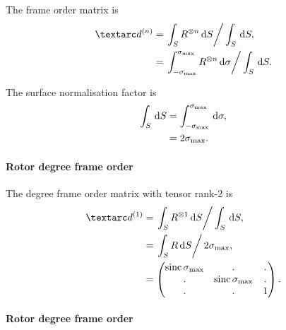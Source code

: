 The frame order matrix is
\begin{subequations}
\begin{align}
    \FOn &= \left. \int_S R^{\otimes n} \diff S \right / \int_S \diff S, \\
         &= \left. \int_{-\conesmax}^{\conesmax} R^{\otimes n} \diff \sigma  \right / \int_S \diff S.
\end{align}
\end{subequations}

The surface normalisation factor is
\begin{subequations}
\begin{align}
    \int_S \,\mathrm{d} S &= \int_{-\sigma_\textrm{max}}^{\sigma_\textrm{max}} \,\mathrm{d} \sigma , \\
                   &= 2\sigma_\textrm{max} .
\end{align}
\end{subequations}


\paragraph{Rotor  degree frame order}

The  degree frame order matrix with tensor rank-2 is
\begin{subequations} \label{eq: rotor 1st degree frame order matrix}
\begin{align}
    \FOone &= \left. \int_S R^{\otimes 1} \diff S \right / \int_S \diff S, \\
           &= \left. \int_S R \diff S \right / 2\conesmax, \\
           &= \begin{pmatrix}
                  \sinc\conesmax & .              & . \\
                  .              & \sinc\conesmax & . \\
                  .              & .              & 1 \\
              \end{pmatrix} .
\end{align}
\end{subequations}


\paragraph{Rotor  degree frame order}

